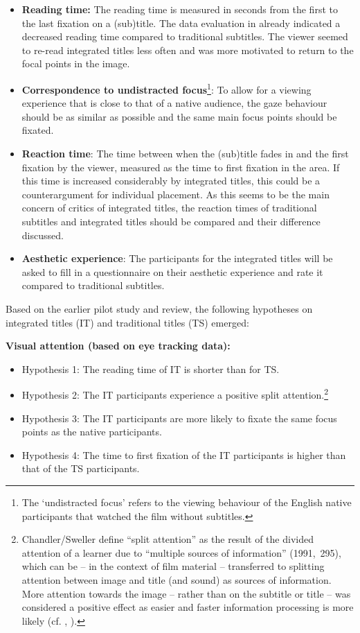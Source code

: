 \documentclass[output=paper]{langsci/langscibook}
\begin{document}
\begin{itemize}
\item \textbf{Reading time:} The reading time is measured in seconds from the first to the last fixation on a (sub)title. The data evaluation in \citet{fox2012} already indicated a decreased reading time compared to traditional subtitles. The viewer seemed to re-read integrated titles less often and was more motivated to return to the focal points in the image.
\item \textbf{Correspondence to undistracted focus}\footnote{The ‘undistracted focus’ refers to the viewing behaviour of the English native participants that watched the film without subtitles.}: To allow for a viewing experience that is close to that of a native audience, the gaze behaviour should be as similar as possible and the same main focus points should be fixated.
\item \textbf{Reaction time}: The time between when the (sub)title fades in and the first fixation by the viewer, measured as the time to first fixation in the area. If this time is increased considerably by integrated titles, this could be a counterargument for individual placement. As this seems to be the main concern of critics of integrated titles, the reaction times of traditional subtitles and integrated titles should be compared and their difference discussed.
\item \textbf{Aesthetic experience}: The participants for the integrated titles will be asked to fill in a questionnaire on their aesthetic experience and rate it compared to traditional subtitles.
\end{itemize}


Based on the earlier pilot study and review, the following hypotheses on integrated titles (IT) and traditional titles (TS) emerged:

\textbf{Visual attention (based on eye tracking data):}

\begin{itemize}
\item Hypothesis 1: The reading time of IT is shorter than for TS.
\item Hypothesis 2: The IT participants experience a positive split attention.\footnote{Chandler/Sweller define “split attention” as the result of the divided attention of a learner due to “multiple sources of information” (1991,~295), which can be – in the context of film material –  transferred to splitting attention between image and title (and sound) as sources of information. More attention towards the image – rather than on the subtitle or title – was considered a positive effect as easier and faster information processing is more likely (cf. \citet[151]{drescher1997}, \citet{grady1993}).}
\item Hypothesis 3: The IT participants are more likely to fixate the same focus points as the native participants.
\item Hypothesis 4: The time to first fixation of the IT participants is higher than that of the TS participants.
\end{itemize}
\end{document}

